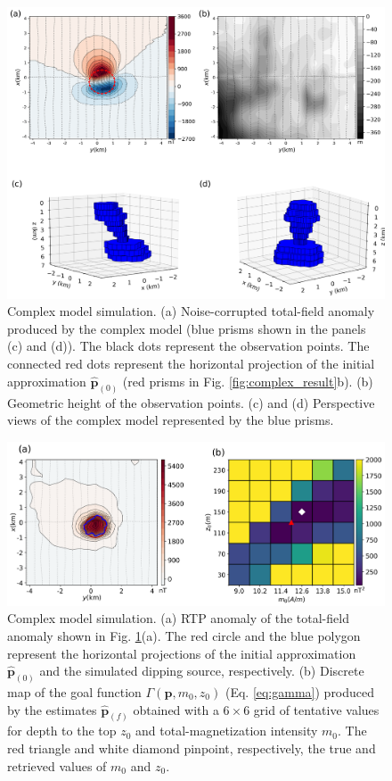 \begin{figure}
    \centering
    \includegraphics[width=\linewidth]{figures/complex_model_data.png}
    \caption{Complex model simulation. (a) Noise-corrupted total-field anomaly produced by the complex model (blue prisms shown in the panels (c) and (d)). The black dots represent the observation points. The connected red dots represent the horizontal projection 
   	of the initial approximation $\hat{\mathbf{p}}_{(0)}$ 
   	(red prisms in Fig. \ref{fig:complex_result}b). (b) Geometric height of the observation points. (c) and (d) Perspective views of the complex model represented by the blue prisms.
}
    \label{fig:complex_model}
\end{figure}

\begin{figure}
    \centering
    \includegraphics[width=\linewidth]{figures/complex_rtp.png}
    \caption{Complex model simulation. (a) RTP anomaly of the total-field anomaly
    shown in Fig. \ref{fig:complex_model}(a). 
	The red circle and the blue polygon represent the horizontal projections of the
	initial approximation $\hat{\mathbf{p}}_{(0)}$ and  the simulated dipping source,
	respectively.
	(b) Discrete map of the goal function $\Gamma(\mathbf{p}, m_0, z_0)$ (Eq.
	\ref{eq:gamma}) produced by the estimates $\hat{\mathbf{p}}_{(f)}$ obtained with
	a $6 \times 6$ grid of tentative values for depth to the top $z_0$ and
	total-magnetization intensity $m_0$.
	The red triangle and white diamond pinpoint, respectively, the true and
	retrieved values of $m_0$ and $z_0$.     
}
    \label{fig:complex_rtp}
\end{figure}

